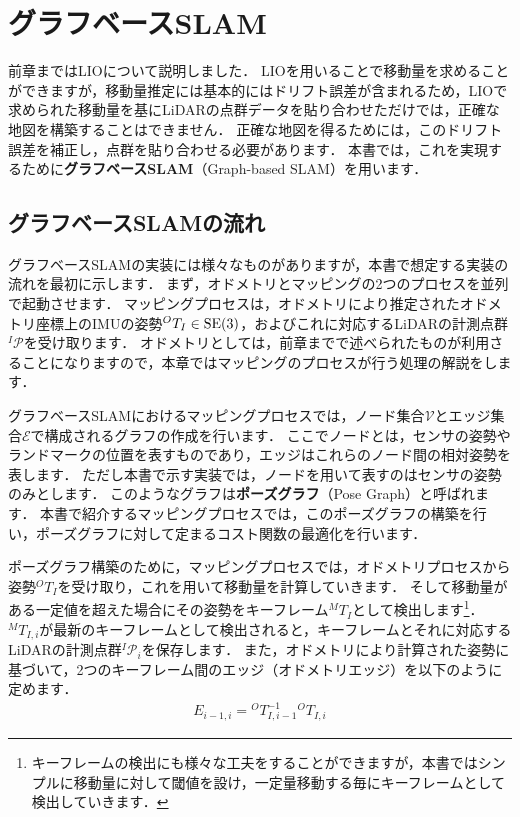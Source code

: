 \chapter{グラフベースSLAM}

前章まではLIOについて説明しました．
LIOを用いることで移動量を求めることができますが，移動量推定には基本的にはドリフト誤差が含まれるため，LIOで求められた移動量を基にLiDARの点群データを貼り合わせただけでは，正確な地図を構築することはできません．
正確な地図を得るためには，このドリフト誤差を補正し，点群を貼り合わせる必要があります．
本書では，これを実現するために{\bf グラフベースSLAM}（Graph-based SLAM）を用います．










\section{グラフベースSLAMの流れ}

グラフベースSLAMの実装には様々なものがありますが，本書で想定する実装の流れを最初に示します．
まず，オドメトリとマッピングの2つのプロセスを並列で起動させます．
マッピングプロセスは，オドメトリにより推定されたオドメトリ座標上のIMUの姿勢${}^{O}T_{I} \in {\rm SE}(3)$，およびこれに対応するLiDARの計測点群${}^{I}\mathcal{P}$を受け取ります．
オドメトリとしては，前章までで述べられたものが利用さることになりますので，本章ではマッピングのプロセスが行う処理の解説をします．

グラフベースSLAMにおけるマッピングプロセスでは，ノード集合$\mathcal{V}$とエッジ集合$\mathcal{E}$で構成されるグラフの作成を行います．
ここでノードとは，センサの姿勢やランドマークの位置を表すものであり，エッジはこれらのノード間の相対姿勢を表します．
ただし本書で示す実装では，ノードを用いて表すのはセンサの姿勢のみとします．
このようなグラフは{\bf ポーズグラフ}（Pose Graph）と呼ばれます．
本書で紹介するマッピングプロセスでは，このポーズグラフの構築を行い，ポーズグラフに対して定まるコスト関数の最適化を行います．

ポーズグラフ構築のために，マッピングプロセスでは，オドメトリプロセスから姿勢${}^{O}T_{I}$を受け取り，これを用いて移動量を計算していきます．
そして移動量がある一定値を超えた場合にその姿勢をキーフレーム${}^{M}T_{I}$として検出します\footnote{ キーフレームの検出にも様々な工夫をすることができますが，本書ではシンプルに移動量に対して閾値を設け，一定量移動する毎にキーフレームとして検出していきます． }．
${}^{M}T_{I, i}$が最新のキーフレームとして検出されると，キーフレームとそれに対応するLiDARの計測点群${}^{I}\mathcal{P}_{i}$を保存します．
また，オドメトリにより計算された姿勢に基づいて，2つのキーフレーム間のエッジ（オドメトリエッジ）を以下のように定めます．
%
\begin{align}
  E_{i-1, i} = {}^{O}T_{I, i-1}^{-1} {}^{O}T_{I, i}
  \label{eq:odometry_edge}
\end{align}
%

